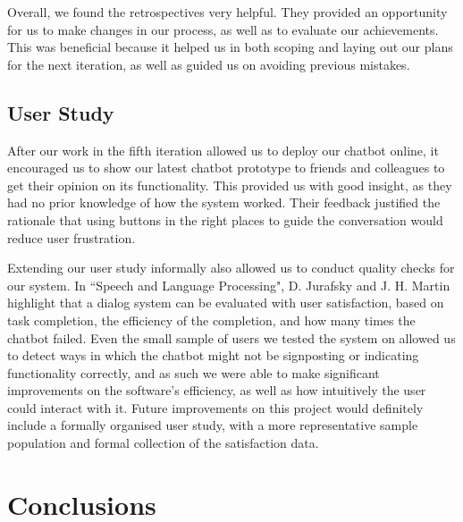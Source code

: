 \documentclass{l3proj}
\begin{document}
Overall, we found the retrospectives very helpful. They provided an opportunity for us to make changes in our process, as well as to evaluate our achievements. This was beneficial because it helped us in both scoping and laying out our plans for the next iteration, as well as guided us on avoiding previous mistakes.

\subsection{User Study}

After our work in the fifth iteration allowed us to deploy our chatbot online, it encouraged us to show our latest chatbot prototype to friends and colleagues to get their opinion on its functionality. This provided us with good insight, as they had no prior knowledge of how the system worked. Their feedback justified the rationale that using buttons in the right places to guide the conversation would reduce user frustration.

Extending our user study informally also allowed us to conduct quality checks for our system. In ``Speech and Language Processing", D. Jurafsky and J. H. Martin highlight that a dialog system can be evaluated with user satisfaction, based on task completion, the efficiency of the completion, and how many times the chatbot failed\cite{SLP:Jurafsky}. Even the small sample of users we tested the system on allowed us to detect ways in which the chatbot might not be signposting or indicating functionality correctly, and as such we were able to make significant improvements on the software's efficiency, as well as how intuitively the user could interact with it. Future improvements on this project would definitely include a formally organised user study, with a more representative sample population and formal collection of the satisfaction data.



\section{Conclusions}
\label{sec:conclusion}

\end{document}
